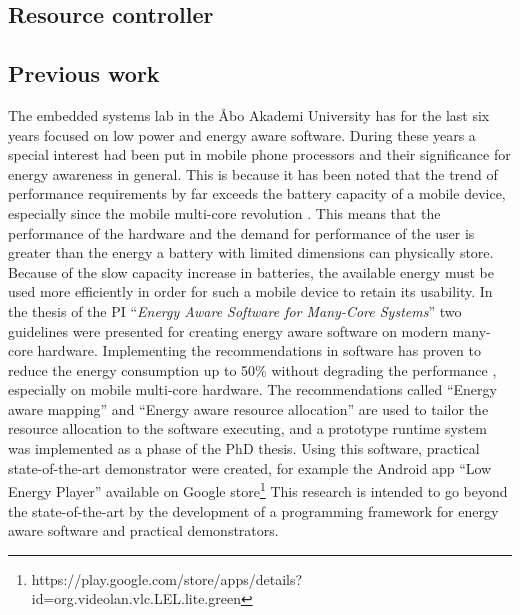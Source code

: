 \documentclass{article}
\begin{document}
\subsection{Resource controller}


\subsection{Previous work}
The embedded systems lab in the \AA{}bo Akademi University has for the last six years focused on low power and energy aware software. 
During these years a special interest had been put in mobile phone processors and their significance for energy awareness in general. 
This is because it has been noted that the trend of performance requirements by far exceeds the battery capacity of a mobile device, especially since the mobile multi-core revolution \cite{BatteryCapacity,CPUCapacity}. 
This means that the performance of the hardware and the demand for performance of the user is greater than the energy a battery with limited dimensions can physically store. 
Because of the slow capacity increase in batteries, the available energy must be used more efficiently in order for such a mobile device to retain its usability.
In the thesis of the PI ``\textit{Energy Aware Software for Many-Core Systems}'' two guidelines were presented for creating energy aware software on modern many-core hardware. 
Implementing the recommendations in software has proven to reduce the energy consumption up to 50\% without degrading the performance \cite{HolmbackaHipeac}, especially on mobile multi-core hardware. 
The recommendations called ``Energy aware mapping'' and ``Energy aware resource allocation'' are used to tailor the resource allocation to the software executing, 
and a prototype runtime system was implemented as a phase of the PhD thesis. 
Using this software, practical state-of-the-art demonstrator were created, for example the Android app ``Low Energy Player'' available on Google store\footnote{https://play.google.com/store/apps/details?id=org.videolan.vlc.LEL.lite.green}
This research is intended to go beyond the state-of-the-art by the development of a programming framework for energy aware software and practical demonstrators.
\end{document}
